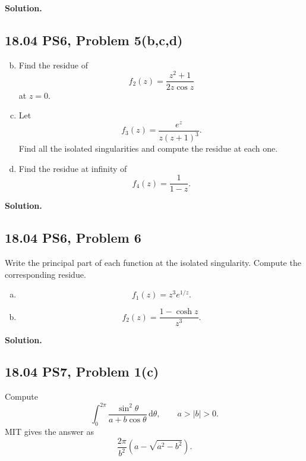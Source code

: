 \documentclass{article}
\newcommand{\dd}{\mathrm{d}}
\newenvironment{solution}{%
  \par\medskip\noindent\textbf{Solution.}\par
}{\par\medskip}
\begin{document}
\begin{solution}
\end{solution}

\subsection*{18.04 PS6, Problem 5(b,c,d)}

\begin{enumerate}[(a)]
  \setcounter{enumi}{1}
  \item Find the residue of
  \[
    f_2(z)=\frac{z^2+1}{2z\cos z}
  \]
  at $z=0$.

  \item Let
  \[
    f_3(z)=\frac{e^z}{z(z+1)^3}.
  \]
  Find all the isolated singularities and compute the residue at each one.

  \item Find the residue at infinity of
  \[
    f_4(z)=\frac{1}{1-z}.
  \]
\end{enumerate}

\begin{solution}
\end{solution}

\subsection*{18.04 PS6, Problem 6}

Write the principal part of each function at the isolated singularity.
Compute the corresponding residue.
\begin{enumerate}[(a)]
  \item
  \[
    f_1(z)=z^3e^{1/z}.
  \]

  \item
  \[
    f_2(z)=\frac{1-\cosh z}{z^3}.
  \]
\end{enumerate}

\begin{solution}
\end{solution}

\subsection*{18.04 PS7, Problem 1(c)}

Compute
\[
  \int_0^{2\pi}\frac{\sin^2\theta}{a+b\cos\theta}\,\dd\theta,
  \qquad a>|b|>0.
\]
MIT gives the answer as
\[
  \frac{2\pi}{b^2}\left(a-\sqrt{a^2-b^2}\right).
\]
\end{document}
